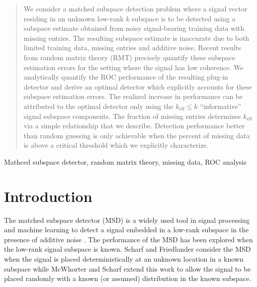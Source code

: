 \begin{abstract}
We consider a matched subspace detection problem where a signal vector residing in an unknown low-rank $k$ subspace is to be detected using a subspace estimate obtained from noisy signal-bearing training data with missing entries. The resulting subspace estimate is inaccurate due to both limited training data, missing entries and additive noise. Recent results from random matrix theory (RMT) precisely quantify these subspace estimation errors for the setting where the signal has low coherence. We analytically quantify the ROC performance of the resulting plug-in detector and derive an optimal detector which explicitly accounts for these subspace estimation errors. The realized increase in performance can be attributed to the optimal detector only using the $k_\text{eff}\leq k$ ``informative'' signal subspace components. The fraction of missing entries determines $k_\text{eff}$ via a simple relationship that we describe. Detection performance better than random guessing is only achievable when the percent of missing data is above a critical threshold which we explicitly characterize.
\end{abstract}
%
\begin{keywords}
Mathced subspace detector, random matrix theory, missing data, ROC analysis
\end{keywords}
%
\section{Introduction}\label{sec:intro}

The matched subspace detector (MSD) is a widely used tool in signal processing and machine learning to detect a signal embedded in a low-rank subspace in the presence of additive noise \cite{scharf1994matched,jin2005cfar,mcwhorter2003matched}. The performance of the MSD has been explored when the low-rank signal subspace is known. Scharf and Friedlander \cite{scharf1994matched} consider the MSD when the signal is placed deterministically at an unknown location in a known subspace while McWhorter and Scharf \cite{mcwhorter2003matched} extend this work to allow the signal to be placed randomly with a known (or assumed) distribution in the known subspace.

